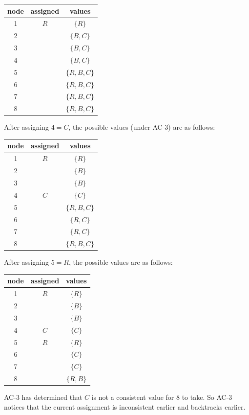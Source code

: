 \documentclass[10pt,\jkfside,a4paper]{article}
\begin{document}
\begin{enumerate}
\begin{itemize}
\begin{table}[H]
\centering
\begin{tabular}{c|c|c}
node & assigned & values \\
\hline
1 & $R$ & $\{R\}$ \\
2 & & $\{B, C\}$ \\
3 & & $\{B, C\}$ \\
4 & & $\{B, C\}$ \\
5 & & $\{R, B, C\}$ \\
6 & & $\{R, B, C\}$ \\
7 & & $\{R, B, C\}$ \\
8 & & $\{R, B, C\}$ \\
\end{tabular}
\end{table}

After assigning $4 = C$, the possible values (under AC-3) are as follows:

\begin{table}[H]
\centering
\begin{tabular}{c|c|c}
node & assigned & values \\
\hline
1 & $R$ & $\{R\}$ \\
2 & & $\{B\}$ \\
3 & & $\{B\}$ \\
4 & $C$ & $\{C\}$ \\
5 & & $\{R, B, C\}$ \\
6 & & $\{R, C\}$ \\
7 & & $\{R, C\}$ \\
8 & & $\{R, B, C\}$ \\
\end{tabular}
\end{table}

After assigning $5 = R$, the possible values are as follows:

\begin{table}[H]
\centering
\begin{tabular}{c|c|c}
node & assigned & values \\
\hline
1 & $R$ & $\{R\}$ \\
2 & & $\{B\}$ \\
3 & & $\{B\}$ \\
4 & $C$ & $\{C\}$ \\
5 & $R$ & $\{R\}$ \\
6 & & $\{C\}$ \\
7 & & $\{C\}$ \\
8 & & $\{R, B\}$ \\
\end{tabular}
\end{table}

AC-3 has determined that $C$ is not a consistent value for $8$ to take. So
AC-3 notices that the current assignment is inconsistent earlier and
backtracks earlier.

\end{itemize}

\end{enumerate}
\end{document}
